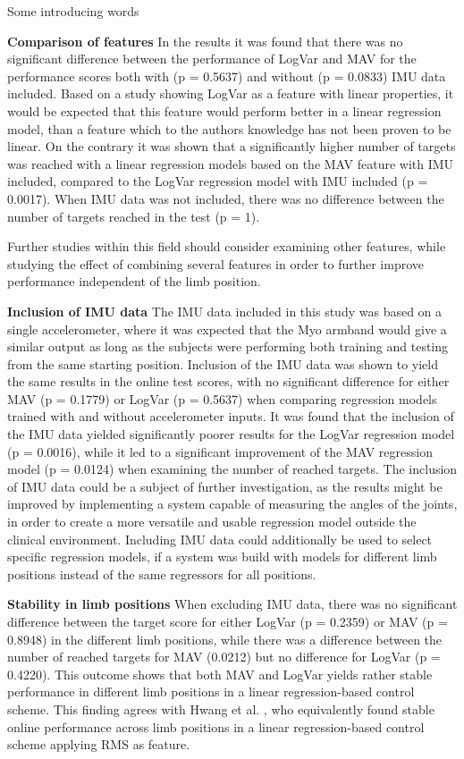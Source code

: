 Some introducing words

\textbf{Comparison of features}
In the results it was found that there was no significant difference between the performance of LogVar and MAV for the performance scores both with (p = 0.5637) and without (p = 0.0833) IMU data included. Based on a study \cite{hahne2014} showing LogVar as a feature with linear properties, it would be expected that this feature would perform better in a linear regression model, than a feature which to the authors knowledge has not been proven to be linear. On the contrary it was shown that a significantly higher number of targets was reached with a linear regression models based on the MAV feature with IMU included, compared to the LogVar regression model with IMU included (p = 0.0017). When IMU data was not included, there was no difference between the number of targets reached in the test (p = 1).

Further studies within this field should consider examining other features, while studying the effect of combining several features in order to further improve performance independent of the limb position.

\textbf{Inclusion of IMU data}
The IMU data included in this study was based on a single accelerometer, where it was expected that the Myo armband would give a similar output as long as the subjects were performing both training and testing from the same starting position. Inclusion of the IMU data was shown to yield the same results in the online test scores, with no significant difference for either MAV (p = 0.1779) or LogVar (p = 0.5637) when comparing regression models trained with and without accelerometer inputs. It was found that the inclusion of the IMU data yielded significantly poorer results for the LogVar regression model (p = 0.0016), while it led to a significant improvement of the MAV regression model (p = 0.0124) when examining the number of reached targets. The inclusion of IMU data could be a subject of further investigation, as the results might be improved by implementing a system capable of measuring the angles of the joints, in order to create a more versatile and usable regression model outside the clinical environment. Including IMU data could additionally be used to select specific regression models, if a system was build with models for different limb positions instead of the same regressors for all positions.

\textbf{Stability in limb positions}
When excluding IMU data, there was no significant difference between the target score for either LogVar (p = 0.2359) or MAV (p = 0.8948) in the different limb positions, while there was a difference between the number of reached targets for MAV (0.0212) but no difference for LogVar (p = 0.4220). This outcome shows that both MAV and LogVar yields rather stable performance in different limb positions in a linear regression-based control scheme. This finding agrees with Hwang et al. \cite{Hwang2017}, who equivalently found stable online performance across limb positions in a linear regression-based control scheme applying RMS as feature.

